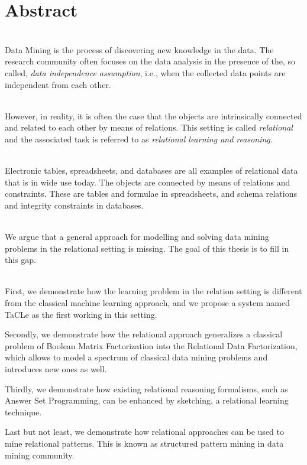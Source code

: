 \chapter{Abstract} \label{ch:abstract}
\\
Data Mining is the process of discovering new knowledge in the data.
The research community often focuses on the data
analysis in the presence of the, so called, \textit{data independence assumption}, i.e.,
when the collected data points are independent from each other.

\\
However, in reality, it is often the case that the objects are 
intrinsically connected and related to each other by means of relations. 
This setting is called \textit{relational} and the associated task 
is referred to as \textit{relational learning and reasoning}.

\\
Electronic tables, spreadsheets, and databases are all examples of
relational data that is in wide use today. The objects are connected
by means of relations and constraints. These are
tables and formulae in spreadsheets, and  schema relations and integrity
constraints in databases.

\\
We argue that a general approach for modelling and solving data mining  
problems in the relational setting is missing. The goal of this thesis
is to fill in this gap.


\\
First, we demonstrate how the learning problem in the relation
setting is different from the classical machine learning approach, and we
propose a system named TaCLe as the first working in this setting.

Secondly, we demonstrate how the relational approach generalizes a
classical problem of Boolean Matrix Factorization into the Relational
Data Factorization, which allows to model a spectrum of classical data
mining problems and introduces new ones as well.

Thirdly, we demonstrate how existing relational reasoning formalisms,
such as Answer Set Programming, can be enhanced by sketching, a relational learning
technique.

Last but not least, we demonstrate how relational approaches can be used
to mine relational patterns. This is known as structured pattern mining in
data mining community.


\cleardoublepage

